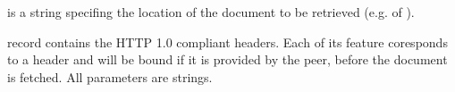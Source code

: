 \documentclass{ozdoc}
\begin{document}
 is a string specifing the  location of the document to be retrieved (e.g.  of ). \mozartEMPTY


\label{SUBSECTION.OUTPRMS}



\begin{mozartDESCRIPTION}
\mozartENTRYHASCODE
\begin{mozartSYNOPSIS}
\begin{mozartCODEDISPLAY}\mozartFACETEXT{)\mozartSPACE{}}\end{mozartCODEDISPLAY}
\end{mozartSYNOPSIS}
\mozartITEM {} record contains the HTTP 1.0 compliant headers. Each of its feature coresponds to a header and will be bound if it is provided by the peer, before the document is fetched. All parameters are strings.  


\end{mozartDESCRIPTION}
\end{document}
